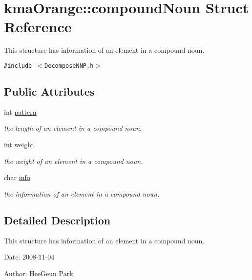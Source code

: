 \hypertarget{structkmaOrange_1_1compoundNoun}{
\section{kmaOrange::compoundNoun Struct Reference}
\label{structkmaOrange_1_1compoundNoun}
}
This structure has information of an element in a compound noun.  


{\tt \#include $<$DecomposeNNP.h$>$}

\subsection*{Public Attributes}
\begin{CompactItemize}
\item 
int \hyperlink{structkmaOrange_1_1compoundNoun_b885769e0499b45eebb244c95981f100}{pattern}
\begin{CompactList}\small\item\em the length of an element in a compound noun. \item\end{CompactList}\item 
int \hyperlink{structkmaOrange_1_1compoundNoun_d3c3b54777b32d9f99782414d77ab9c8}{weight}
\begin{CompactList}\small\item\em the weight of an element in a compound noun. \item\end{CompactList}\item 
char \hyperlink{structkmaOrange_1_1compoundNoun_c9ebf6e5cad7f65007a726feec4aca49}{info}
\begin{CompactList}\small\item\em the information of an element in a compound noun. \item\end{CompactList}\end{CompactItemize}


\subsection{Detailed Description}
This structure has information of an element in a compound noun. 

\begin{Desc}
\item[Date:]2008-11-04 \end{Desc}
\begin{Desc}
\item[Author:]HeeGeun Park \end{Desc}



